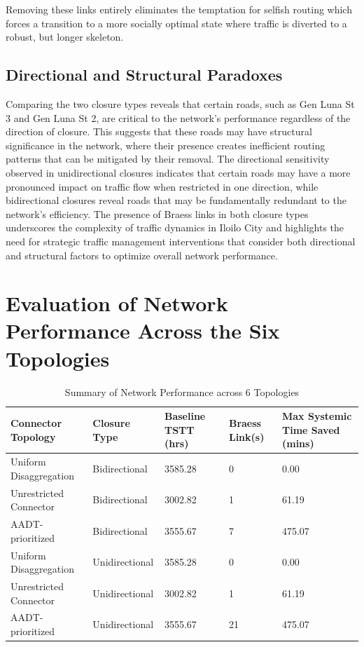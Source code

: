 Removing these links entirely eliminates the temptation for selfish routing which forces a transition to a more socially optimal state where traffic is diverted to a robust, but longer skeleton.

\subsection{Directional and Structural Paradoxes}
\label{sec:directional_structural_paradoxes}
Comparing the two closure types reveals that certain roads, such as Gen Luna St 3 and Gen Luna St 2, are critical to the network's performance regardless of the direction of closure. This suggests that these roads may have structural significance in the network, where their presence creates inefficient routing patterns that can be mitigated by their removal. The directional sensitivity observed in unidirectional closures indicates that certain roads may have a more pronounced impact on traffic flow when restricted in one direction, while bidirectional closures reveal roads that may be fundamentally redundant to the network's efficiency. The presence of Braess links in both closure types underscores the complexity of traffic dynamics in Iloilo City and highlights the need for strategic traffic management interventions that consider both directional and structural factors to optimize overall network performance.

\section{Evaluation of Network Performance Across the Six Topologies}
\label{sec:eval_6}

{
\begin{table}[htbp]
\centering
\small 
\setlength{\tabcolsep}{4pt} 
\renewcommand{\thetable}{5.3}


\begin{tabular}{|p{3.8cm}|p{2.5cm}|p{2cm}|p{2.5cm}|p{2.5cm}|} 
\hline
\textbf{Connector Topology} & \textbf{Closure Type} & \textbf{Baseline TSTT (hrs)} & \textbf{Braess Link(s)} & \textbf{Max Systemic Time Saved (mins)} \\ \hline

Uniform Disaggregation & Bidirectional & 3585.28 & 0 & 0.00 \\ \hline
Unrestricted Connector & Bidirectional & 3002.82 & 1 & 61.19 \\ \hline
AADT-prioritized & Bidirectional & 3555.67 & 7 & 475.07 \\ \hline
Uniform Disaggregation & Unidirectional & 3585.28 & 0 & 0.00 \\ \hline
Unrestricted Connector & Unidirectional & 3002.82 & 1 & 61.19 \\ \hline
AADT-prioritized & Unidirectional & 3555.67 & 21 & 475.07 \\ \hline
\end{tabular}

\caption{Summary of Network Performance across 6 Topologies}
\label{tab:5.3}
\end{table}
}

